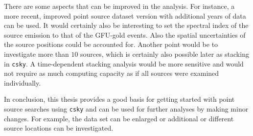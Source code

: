 There are some aspects that can be improved in the analysis.
For instance, a more recent, improved point source dataset version with additional years of data can be used.
It would certainly also be interesting to set the spectral index of the source emission to that of the GFU-gold events.
Also the spatial uncertainties of the source positions could be accounted for.
Another point would be to investigate more than $\num{10}$ sources, which is certainly also possible later as stacking in \texttt{csky}.
A time-dependent stacking analysis would be more sensitive and would not require as much computing capacity as if all sources were examined individually.

In conclusion, this thesis provides a good basis for getting started with point source searches using \texttt{csky} and can be used for further analyses by making minor changes.
For example, the data set can be enlarged or additional or different source locations can be investigated.


